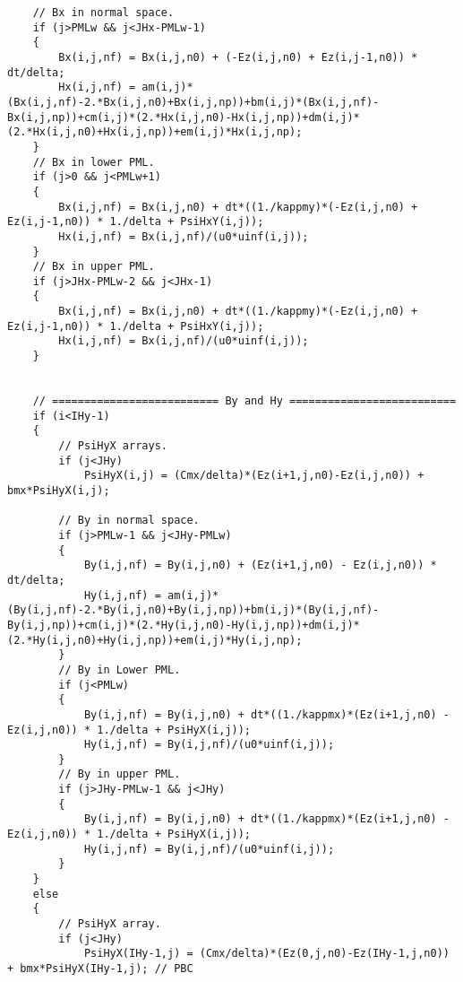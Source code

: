 \begin{lstlisting}
	// Bx in normal space.
	if (j>PMLw && j<JHx-PMLw-1)
	{
		Bx(i,j,nf) = Bx(i,j,n0) + (-Ez(i,j,n0) + Ez(i,j-1,n0)) * dt/delta;
		Hx(i,j,nf) = am(i,j)*(Bx(i,j,nf)-2.*Bx(i,j,n0)+Bx(i,j,np))+bm(i,j)*(Bx(i,j,nf)-Bx(i,j,np))+cm(i,j)*(2.*Hx(i,j,n0)-Hx(i,j,np))+dm(i,j)*(2.*Hx(i,j,n0)+Hx(i,j,np))+em(i,j)*Hx(i,j,np);
	}
	// Bx in lower PML.
	if (j>0 && j<PMLw+1)
	{
		Bx(i,j,nf) = Bx(i,j,n0) + dt*((1./kappmy)*(-Ez(i,j,n0) + Ez(i,j-1,n0)) * 1./delta + PsiHxY(i,j));
		Hx(i,j,nf) = Bx(i,j,nf)/(u0*uinf(i,j));
	}
	// Bx in upper PML.
	if (j>JHx-PMLw-2 && j<JHx-1)
	{
		Bx(i,j,nf) = Bx(i,j,n0) + dt*((1./kappmy)*(-Ez(i,j,n0) + Ez(i,j-1,n0)) * 1./delta + PsiHxY(i,j));
		Hx(i,j,nf) = Bx(i,j,nf)/(u0*uinf(i,j));
	}


	// ========================== By and Hy ==========================
	if (i<IHy-1)
	{
		// PsiHyX arrays.
		if (j<JHy)
			PsiHyX(i,j) = (Cmx/delta)*(Ez(i+1,j,n0)-Ez(i,j,n0)) + bmx*PsiHyX(i,j);

		// By in normal space.
		if (j>PMLw-1 && j<JHy-PMLw)
		{
			By(i,j,nf) = By(i,j,n0) + (Ez(i+1,j,n0) - Ez(i,j,n0)) * dt/delta;
			Hy(i,j,nf) = am(i,j)*(By(i,j,nf)-2.*By(i,j,n0)+By(i,j,np))+bm(i,j)*(By(i,j,nf)-By(i,j,np))+cm(i,j)*(2.*Hy(i,j,n0)-Hy(i,j,np))+dm(i,j)*(2.*Hy(i,j,n0)+Hy(i,j,np))+em(i,j)*Hy(i,j,np);
		}
		// By in Lower PML.
		if (j<PMLw)
		{
			By(i,j,nf) = By(i,j,n0) + dt*((1./kappmx)*(Ez(i+1,j,n0) - Ez(i,j,n0)) * 1./delta + PsiHyX(i,j));
			Hy(i,j,nf) = By(i,j,nf)/(u0*uinf(i,j));
		}
		// By in upper PML.
		if (j>JHy-PMLw-1 && j<JHy)
		{
			By(i,j,nf) = By(i,j,n0) + dt*((1./kappmx)*(Ez(i+1,j,n0) - Ez(i,j,n0)) * 1./delta + PsiHyX(i,j));
			Hy(i,j,nf) = By(i,j,nf)/(u0*uinf(i,j));
		}
	}
	else
	{
		// PsiHyX array.
		if (j<JHy)
			PsiHyX(IHy-1,j) = (Cmx/delta)*(Ez(0,j,n0)-Ez(IHy-1,j,n0)) + bmx*PsiHyX(IHy-1,j); // PBC


\end{lstlisting}
